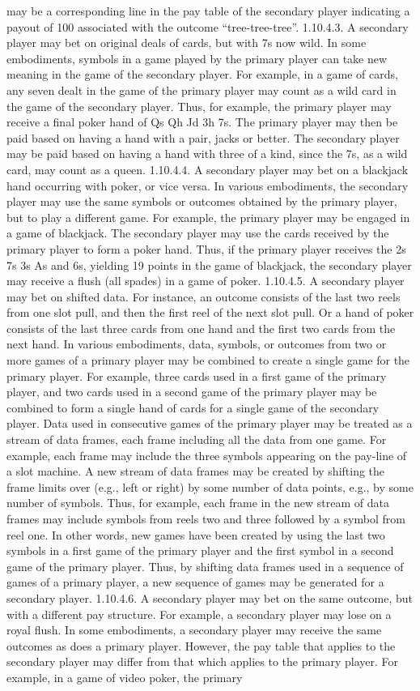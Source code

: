\documentclass[11pt,a4paper]{article}
\begin{document}
may be a corresponding line in the pay table of the secondary player indicating a payout of 100 associated with the outcome “tree-tree-tree”. 1.10.4.3. A secondary player may bet on original deals of cards, but with 7s now wild. In some embodiments, symbols in a game played by the primary player can take new meaning in the game of the secondary player. For example, in a game of cards, any seven dealt in the game of the primary player may count as a wild card in the game of the secondary player. Thus, for example, the primary player may receive a final poker hand of Qs Qh Jd 3h 7s. The primary player may then be paid based on having a hand with a pair, jacks or better. The secondary player may be paid based on having a hand with three of a kind, since the 7s, as a wild card, may count as a queen. 1.10.4.4. A secondary player may bet on a blackjack hand occurring with poker, or vice versa. In various embodiments, the secondary player may use the same symbols or outcomes obtained by the primary player, but to play a different game. For example, the primary player may be engaged in a game of blackjack. The secondary player may use the cards received by the primary player to form a poker hand. Thus, if the primary player receives the 2s 7s 3s As and 6s, yielding 19 points in the game of blackjack, the secondary player may receive a flush (all spades) in a game of poker. 1.10.4.5. A secondary player may bet on shifted data. For instance, an outcome consists of the last two reels from one slot pull, and then the first reel of the next slot pull. Or a hand of poker consists of the last three cards from one hand and the first two cards from the next hand. In various embodiments, data, symbols, or outcomes from two or more games of a primary player may be combined to create a single game for the primary player. For example, three cards used in a first game of the primary player, and two cards used in a second game of the primary player may be combined to form a single hand of cards for a single game of the secondary player. Data used in consecutive games of the primary player may be treated as a stream of data frames, each frame including all the data from one game. For example, each frame may include the three symbols appearing on the pay-line of a slot machine. A new stream of data frames may be created by shifting the frame limits over (e.g., left or right) by some number of data points, e.g., by some number of symbols. Thus, for example, each frame in the new stream of data frames may include symbols from reels two and three followed by a symbol from reel one. In other words, new games have been created by using the last two symbols in a first game of the primary player and the first symbol in a second game of the primary player. Thus, by shifting data frames used in a sequence of games of a primary player, a new sequence of games may be generated for a secondary player. 1.10.4.6. A secondary player may bet on the same outcome, but with a different pay structure. For example, a secondary player may lose on a royal flush. In some embodiments, a secondary player may receive the same outcomes as does a primary player. However, the pay table that applies to the secondary player may differ from that which applies to the primary player. For example, in a game of video poker, the primary 
\end{document}
